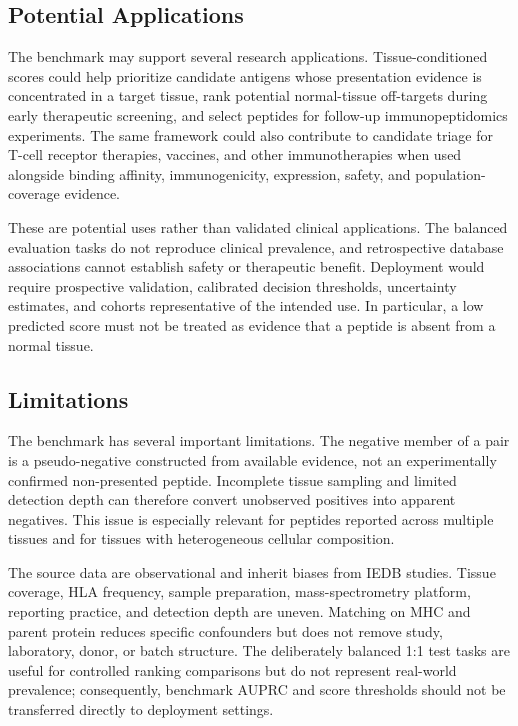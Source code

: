\subsection{Potential Applications}

The benchmark may support several research applications. Tissue-conditioned scores could help prioritize candidate antigens whose presentation evidence is concentrated in a target tissue, rank potential normal-tissue off-targets during early therapeutic screening, and select peptides for follow-up immunopeptidomics experiments. The same framework could also contribute to candidate triage for T-cell receptor therapies, vaccines, and other immunotherapies when used alongside binding affinity, immunogenicity, expression, safety, and population-coverage evidence.

These are potential uses rather than validated clinical applications. The balanced evaluation tasks do not reproduce clinical prevalence, and retrospective database associations cannot establish safety or therapeutic benefit. Deployment would require prospective validation, calibrated decision thresholds, uncertainty estimates, and cohorts representative of the intended use. In particular, a low predicted score must not be treated as evidence that a peptide is absent from a normal tissue.

\subsection{Limitations}

The benchmark has several important limitations. The negative member of a pair is a pseudo-negative constructed from available evidence, not an experimentally confirmed non-presented peptide. Incomplete tissue sampling and limited detection depth can therefore convert unobserved positives into apparent negatives. This issue is especially relevant for peptides reported across multiple tissues and for tissues with heterogeneous cellular composition.

The source data are observational and inherit biases from IEDB studies. Tissue coverage, HLA frequency, sample preparation, mass-spectrometry platform, reporting practice, and detection depth are uneven. Matching on MHC and parent protein reduces specific confounders but does not remove study, laboratory, donor, or batch structure. The deliberately balanced 1:1 test tasks are useful for controlled ranking comparisons but do not represent real-world prevalence; consequently, benchmark AUPRC and score thresholds should not be transferred directly to deployment settings.

